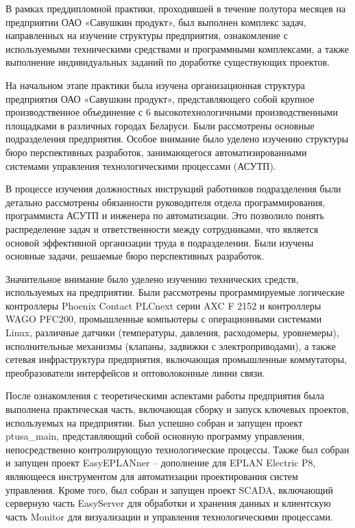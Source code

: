 {\gostFont

\par \redline В рамках преддипломной практики, проходившей в течение полутора месяцев на предприятии ОАО «Савушкин продукт», был выполнен комплекс задач, направленных на изучение структуры предприятия, ознакомление с используемыми техническими средствами и программными комплексами, а также выполнение индивидуальных заданий по доработке существующих проектов.
 
\par \redline На начальном этапе практики была изучена организационная структура предприятия ОАО «Савушкин продукт», представляющего собой крупное производственное объединение с 6 высокотехнологичными производственными площадками в различных городах Беларуси. Были рассмотрены основные подразделения предприятия. Особое внимание было уделено изучению структуры бюро перспективных разработок, занимающегося автоматизированными системами управления технологическими процессами (АСУТП).

\par \redline В процессе изучения должностных инструкций работников подразделения были детально рассмотрены обязанности руководителя отдела программирования, программиста АСУТП и инженера по автоматизации. Это позволило понять распределение задач и ответственности между сотрудниками, что является основой эффективной организации труда в подразделении. Были изучены основные задачи, решаемые бюро перспективных разработок.

\par \redline Значительное внимание было уделено изучению технических средств, используемых на предприятии. Были рассмотрены программируемые логические контроллеры Phoe\-nix Contact PLCnext серии AXC F 2152 и контроллеры WAGO PFC200, промышленные компьютеры с операционными системами Linux, различные датчики (температуры, давления, расходомеры, уровнемеры), исполнительные механизмы (клапаны, задвижки с электроприводами), а также сетевая инфраструктура предприятия, включающая промышленные коммутаторы, преобразователи интерфейсов и оптоволоконные линии связи.

\par \redline После ознакомления с теоретическими аспектами работы предприятия была выполнена практическая часть, включающая сборку и запуск ключевых проектов, используемых на предприятии. Был успешно собран и запущен проект ptusa\_main, представляющий собой основную программу управления, непосредственно контролирующую технологические процессы. Также был собран и запущен проект EasyEPLANner – дополнение для EPLAN Electric P8, являющееся инструментом для автоматизации проектирования систем управления. Кроме того, был собран и запущен проект SCADA, включающий серверную часть EasyServer для обработки и хранения данных и клиентскую часть Monitor для визуализации и управления технологическими процессами.

}
